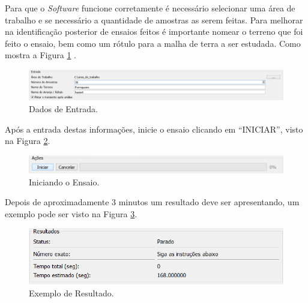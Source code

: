 \documentclass[a4paper, 10pt]{article}
\begin{document}
Para que o \textit{Software} funcione corretamente é necessário selecionar uma 
área de trabalho e se necessário a quantidade de amostras as serem feitas. 
Para melhorar na identificação posterior de ensaios feitos é importante nomear 
o terreno que foi feito o ensaio, bem como um rótulo para a malha de terra a ser 
estudada. Como mostra a Figura \ref{fig_entrando_os_dados} .

\begin{figure}[H]
        \caption{\label{fig_entrando_os_dados}Dados de Entrada.}
	    \begin{center}
            \includegraphics[scale=0.4]{../fotos/execucao/selecionando_area_trabalho_2.png}
	    \end{center}
\end{figure}

Após a entrada destas informações, inicie o ensaio clicando em ``INICIAR'', visto
na Figura \ref{fig_iniciando_ensaio}.

\begin{figure}[H]
        \caption{\label{fig_iniciando_ensaio}Iniciando o Ensaio.}
	    \begin{center}
            \includegraphics[scale=0.4]{../fotos/execucao/iniciando_amostragem.png}
	    \end{center}
\end{figure}

Depois de aproximadamente 3 minutos um resultado deve ser apresentando, um exemplo
pode ser visto na Figura \ref{fig_ex_resultado}.

\begin{figure}[H]
        \caption{\label{fig_ex_resultado}Exemplo de Resultado.}
	    \begin{center}
            \includegraphics[scale=0.4]{../fotos/execucao/resultados.png}
	    \end{center}
\end{figure}
\end{document}
